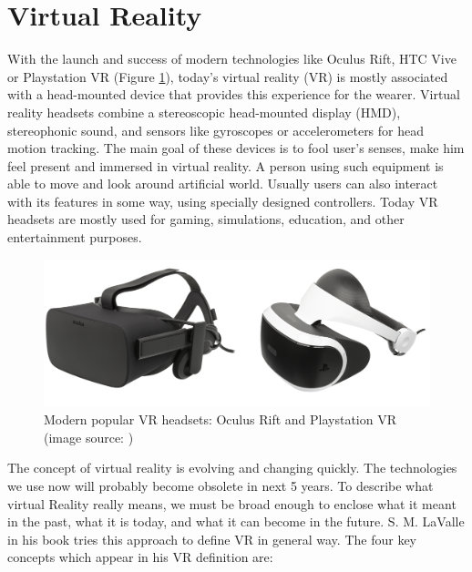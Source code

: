 \section{Virtual Reality}
With the launch and success of modern technologies like Oculus Rift, HTC Vive or Playstation VR (Figure \ref{fig:CONTROLLERS}), today’s virtual reality (VR) is mostly associated with a head-mounted device that provides this experience for the wearer. Virtual reality headsets combine a stereoscopic head-mounted display (HMD), stereophonic sound, and sensors like gyroscopes or accelerometers for head motion tracking. The main goal of these devices is to fool user’s senses, make him feel present and immersed in virtual reality. A person using such equipment is able to move and look around artificial world. Usually users can also interact with its features in some way, using specially designed controllers. Today VR headsets are mostly used for gaming, simulations, education, and other entertainment purposes.

\begin{figure}[th]
\centering
\includegraphics[width=1\textwidth]{img/headsets.png}
\caption{Modern popular VR headsets: Oculus Rift and Playstation VR (image source: \cite{OCULUS_HEADSET}\cite{PSVR_HEADSET})}
\label{fig:CONTROLLERS}
\end{figure}

The concept of virtual reality is evolving and changing quickly. The technologies we use now will probably become obsolete in next 5 years. To describe what virtual Reality really means, we must be broad enough to enclose what it meant in the past, what it is today, and what it can become in the future. S. M. LaValle in his book \cite{VR_BOOK} tries this approach to define VR in general way. The four key concepts which appear in his VR definition are:

